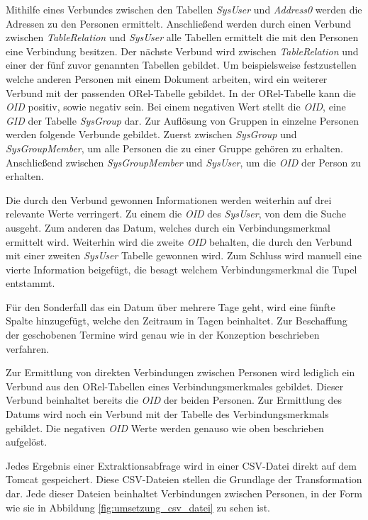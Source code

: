 Mithilfe eines Verbundes zwischen den Tabellen \textit{SysUser} und \textit{Address0} werden die Adressen zu den Personen ermittelt. Anschließend werden durch einen Verbund zwischen \textit{TableRelation} und \textit{SysUser} alle Tabellen ermittelt die mit den Personen eine Verbindung besitzen. Der nächste Verbund wird zwischen \textit{TableRelation} und einer der fünf zuvor genannten Tabellen gebildet. Um beispielsweise festzustellen welche anderen Personen mit einem Dokument arbeiten, wird ein weiterer Verbund mit der passenden ORel-Tabelle gebildet. In der ORel-Tabelle kann die \textit{OID} positiv, sowie negativ sein. Bei einem negativen Wert stellt die \textit{OID}, eine \textit{GID} der Tabelle \textit{SysGroup} dar. Zur Auflösung von Gruppen in einzelne Personen werden folgende Verbunde gebildet. Zuerst zwischen \textit{SysGroup} und \textit{SysGroupMember}, um alle Personen die zu einer Gruppe gehören zu erhalten. Anschließend zwischen \textit{SysGroupMember} und \textit{SysUser}, um die \textit{OID} der Person zu erhalten. 


Die durch den Verbund gewonnen Informationen werden weiterhin auf drei relevante Werte verringert. Zu einem die \textit{OID} des \textit{SysUser}, von dem die Suche ausgeht. Zum anderen das Datum, welches durch ein Verbindungsmerkmal ermittelt wird. Weiterhin wird die zweite \textit{OID} behalten, die durch den Verbund mit einer zweiten \textit{SysUser} Tabelle gewonnen wird. Zum Schluss wird manuell eine vierte Information beigefügt, die besagt welchem Verbindungsmerkmal die Tupel entstammt. 

Für den Sonderfall das ein Datum über mehrere Tage geht, wird eine fünfte Spalte hinzugefügt, welche den Zeitraum in Tagen beinhaltet. Zur Beschaffung der geschobenen Termine wird genau wie in der Konzeption beschrieben verfahren.

Zur Ermittlung von direkten Verbindungen zwischen Personen wird lediglich ein Verbund aus den ORel-Tabellen eines Verbindungsmerkmales gebildet. Dieser Verbund beinhaltet bereits die \textit{OID} der beiden Personen. Zur Ermittlung des Datums wird noch ein Verbund mit der Tabelle des Verbindungsmerkmals gebildet. Die negativen \textit{OID} Werte werden genauso wie oben beschrieben aufgelöst. 

Jedes Ergebnis einer Extraktionsabfrage wird in einer CSV-Datei direkt auf dem Tomcat gespeichert. Diese CSV-Dateien stellen die Grundlage der Transformation dar. Jede dieser Dateien beinhaltet Verbindungen zwischen Personen, in der Form wie sie in Abbildung \ref{fig:umsetzung_csv_datei} zu sehen ist. 

